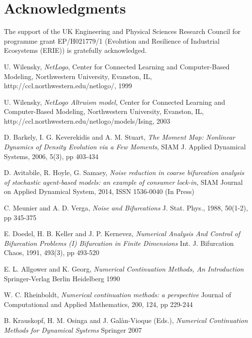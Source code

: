 \documentclass[11pt]{article}
\begin{document}
\section*{Acknowledgments}
{The support of the UK Engineering and Physical Sciences Research Council for programme grant EP/H021779/1 (Evolution and Resilience of Industrial Ecosystems (ERIE)) is gratefully acknowledged.}
 
 
\begin{thebibliography}{10}  

{\sc U. Wilensky}, 
{\it NetLogo},
Center for Connected Learning and Computer-Based Modeling, Northwestern University, Evanston, IL,
http://ccl.northwestern.edu/netlogo/,
1999

{\sc U. Wilensky}, 
{\it NetLogo Altruism model},
Center for Connected Learning and Computer-Based Modeling, Northwestern University, Evanston, IL,
http://ccl.northwestern.edu/netlogo/models/Ising,
2003

{\sc D. Barkely, I. G. Keverekidis and A. M. Stuart},
{\it The Moment Map: Nonlinear Dynamics of Density Evolution via a Few Moments},
SIAM J. Applied Dynamical Systems, 2006, 5(3), pp 403-434

{\sc D. Avitabile, R. Hoyle, G. Samaey},
{\it Noise reduction in coarse bifurcation analysis of stochastic agent-based models: an example of consumer lock-in},
SIAM Journal on Applied Dynamical System, 2014, ISSN 1536-0040 (In Press)

{\sc C. Meunier and A. D. Verga},
{\it Noise and Bifurcations}
J. Stat. Phys., 1988, 50(1-2), pp 345-375

{\sc E. Doedel, H. B. Keller and J. P. Kernevez},
{\it Numerical Analysis And Control of Bifurcation Problems (I) Bifurcation in Finite Dimensions}
Int. J. Bifurcation Chaos, 1991, 493(3), pp 493-520

{\sc E. L. Allgower and K. Georg},
{\it Numerical Continuation Methods, An Introduction}
Springer-Verlag Berlin Heidelberg 1990

{\sc W. C. Rheinboldt},
{\it Numerical continuation methods: a perspective}
Journal of Computational and Applied Mathematics, 200, 124, pp 229-244

{\sc B. Krauskopf, H. M. Osinga and J. Gal\`{a}n-Vioque (Eds.)},
{\it Numerical Continuation Methods for Dynamical Systems}
Springer 2007


\end{thebibliography}
\end{document}
